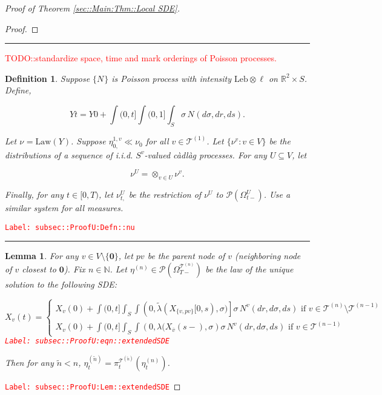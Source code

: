 \documentclass[12pt]{article}
\newcommand{\mb}{\mathbb}
\newcommand{\mc}{\mathcal}
\newcommand{\ov}{\overline}
\newcommand{\te}{\text}
\newcommand{\tr}{\textcolor{red}}
\newcommand{\labe}[1]{\tr{\texttt{Label: #1}}}
\newcommand{\lin}{\rule{\linewidth}{0.4 pt}}
\newcommand{\pmsr}{\mc{P}}							%
\renewcommand{\root}{\mathbf{0}}				%
\renewcommand{\v}{v}							%
\renewcommand{\U}{U}							%
\renewcommand{\S}{S}							%
\newcommand{\s}{\sigma}							%
\newcommand{\T}{T}								%
\renewcommand{\t}{t}							%
\newcommand{\sset}{\Omega}						%
\newcommand{\proj}{\pi}							%
\renewcommand{\tt}{s}							%
\newcommand{\X}{X}								%
\newcommand{\vind}[1]{^{#1}}					%
\newcommand{\carp}[1]{^{#1}}					%
\newcommand{\vsi}[1]{^{#1}}						%
\newcommand{\cind}[1]{_{#1}}					%
\newcommand{\cl}{\ov}							%
\newcommand{\tp}[1]{(#1)}						%
\newcommand{\tip}[1]{#1}						%
\newcommand{\ts}[1]{_{#1}}						%
\newcommand{\slnvind}[2]{^{#1,#2}}				%
\newcommand{\tree}{\mc{T}}						%
\newcommand{\sln}[1]{^{(#1)}}						%
\newcommand{\poiss}{N}							%
\newcommand{\leb}{\te{Leb}}						%
\newcommand{\Sm}{\ell}							%
\newcommand{\rate}{\lambda}						%
\renewcommand{\r}{r}							%
\newcommand{\alt}[1]{\widetilde{#1}}			%
\newcommand{\mm}{\nu}							%
\newcommand{\mmm}{\eta}							%
\newcommand{\law}{\te{Law}}						%
\newcommand{\XX}{Y}								%
\newcommand{\crate}{\alt{\lambda}}				%
\newcommand{\p}{p}								%
\newtheorem{lem}[thms]{Lemma}
\newtheorem{defn}[thms]{Definition}
\begin{document}
\begin{proof}[Proof of Theorem \ref{sec::Main:Thm::Local SDE}]
\begin{proof}
\end{proof}

\lin

\tr{TODO::standardize space, time and mark orderings of Poisson processes.}

\begin{defn}
Suppose \(\{\poiss\vind{}\}\) is Poisson process with intensity \(\leb\otimes \Sm\) on \(\mb{R}^2\times \S\). Define,

\[\XX{}{\t} = \XX{}{0} + \int{(0,\t]}\int{(0,1]}\int_\S\s\,\poiss\vind{}(d\s,d\r,d\tt).\]

Let \(\mm\vind{}\ts{} = \law(\XX{}{})\). Suppose \(\mmm\slnvind{1}{\v}\ts{0,}\ll\mm\vind{}\ts{0}\) for all \(\v\in\tree\sln{1}\). Let \(\{\mm\vind{\v}\ts{}:\v\in V\}\) be the distributions of a sequence of i.i.d. \(\S\carp{\v}\)-valued c\`adl\`ag processes. For any \(\U\subseteq V\), let 

\[\mm\vind{\U}\ts{} = \otimes_{\v\in\U} \mm\vind{\v}\ts{}.\]

Finally, for any \(\t\in [0,\T)\), let \(\mm\vind{\U}\ts{\t,}\) be the restriction of \(\mm\vind{\U}\ts{}\) to \(\pmsr(\sset\vsi{\U}\ts{\t-})\). Use a similar system for all measures.
\label{subsec::ProofU:Defn::nu}
\end{defn}
\labe{subsec::ProofU:Defn::nu}

\lin

\begin{lem}
For any \(\v \in V\setminus\{\root\}\), let \(\p{\v}\) be the parent node of \(\v\) (neighboring node of \(\v\) closest to \(\root\)). Fix \(n \in \mb{N}\). Let \(\mmm\sln{n}\ts{} \in \pmsr\left(\sset\vsi{\tree\sln{n}}\ts{\T-}\right)\) be the law of the unique solution to the following SDE:

\begin{equation}
\X\cind{\v}\tp{\t} = \begin{cases}
\X\cind{\v}\tp{0} + \int{(0,\t]}\int_\S\int{\left(0,\crate{}{}(\X\cind{\{\v,\p{\v}\}}\tip{[0,\tt)},\s)\right]}\s\,\poiss\vind{\v}(d\r,d\s,d\tt)\te{ if } \v \in \tree\sln{n}\setminus \tree\sln{n-1}\\
\X\cind{\v}\tp{0} + \int{(0,\t]}\int_\S\int{\left(0,\rate{}(\X\cind{\cl{\v}}\tp{\tt-},\s\right)}\s\,\poiss\vind{\v}(d\r,d\s,d\tt)\te{ if } \v \in \tree\sln{n-1}
\end{cases}
\label{subsec::ProofU:eqn::extendedSDE}
\end{equation}
\labe{subsec::ProofU:eqn::extendedSDE}

Then for any \(\alt{n} < n\), \(\mmm\sln{\alt{n}}\ts{\t} = \proj\vsi{\tree\sln{\alt{n}}}\ts{\t}(\mmm\sln{n}\ts{\t})\).
\label{subsec::ProofU:Lem::extendedSDE}
\end{lem}
\labe{subsec::ProofU:Lem::extendedSDE}


\end{proof}
\end{document}
